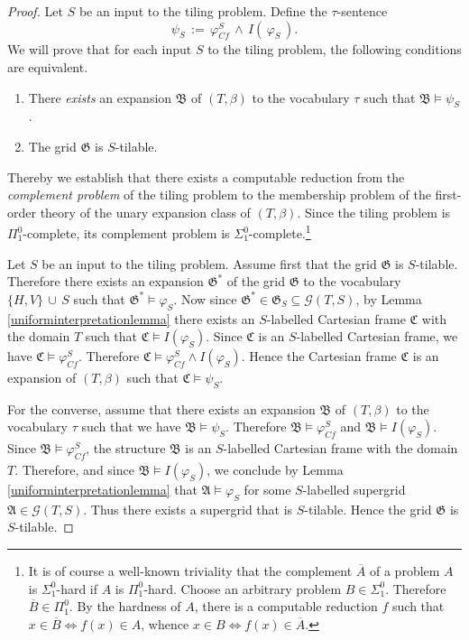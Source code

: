 \documentclass{LMCS}
\theoremstyle{plain}
\newcommand{\mf}{\mathfrak}
\newcommand{\mi}{\mathit}
\begin{document}
\begin{proof}
%
Let $S$ be an input to the tiling problem. Define the $\tau$-sentence 
%
%
%
\[
\psi_{S}\, :=\, 
%
 \varphi_{\mi{Cf}}^S\, \wedge\, I(\, \varphi_{S}\, ).
%
\]
%
%
%
We will prove that for each
%
input $S$ to the tiling problem, the following conditions are equivalent.
%
%
%
\begin{enumerate}
%
\item
There \emph{exists} an expansion $\mf{B}$ of $(T,\beta)$ to the vocabulary $\tau$
%
such that $\mf{B}\models\psi_S$.
%
\item
The grid $\mf{G}$ is $S$-tilable.
%
\end{enumerate}
%
%
%
Thereby we establish that there exists a computable reduction from the
%
\emph{complement problem} of the tiling problem
%
to the membership problem of the first-order theory of the unary expansion class of $(T,\beta)$.
%
Since the tiling problem is $\Pi_1^0$-complete,
%
its complement problem is $\Sigma_1^0$-complete.\footnote{It is of course a
%
well-known triviality that the complement $\overline{A}$ of a problem $A$ is $\Sigma^0_1$-hard
%
if $A$ is $\Pi^0_1$-hard. 
%
Choose an arbitrary problem $B\in \Sigma^0_1$. 
%
Therefore $\overline{B}\in\Pi^0_1$.
%
By the hardness of $A$, there is a computable 
%
reduction $f$ such that $x\in\overline{B}\Leftrightarrow f(x)\in A$, 
%
whence $x\in B\Leftrightarrow f(x)\in \overline{A}$.}
%



%
Let $S$ be an input to the tiling problem.
%
Assume first that the grid $\mf{G}$ is $S$-tilable.
%
Therefore there exists an expansion $\mf{G}^*$ of the grid $\mf{G}$ to the
%
vocabulary $\{H,V\}\, \cup\, S$
%
such that $\mf{G}^*\models\varphi_{S}$.
%
Now since $\mf{G}^*\in\mf{G}_S\subseteq\mathcal{G}(T,S)$, by Lemma \ref{uniforminterpretationlemma} there
%
exists an $S$-labelled Cartesian frame $\mf{C}$ with the domain $T$ such that
%
$\mf{C}\models I(\varphi_{S})$. 
%
Since $\mf{C}$ is an $S$-labelled Cartesian frame, we have $\mf{C}\models \varphi_{\mi{Cf}}^S$.
%
Therefore $\mf{C}\models \varphi_{\mi{Cf}}^S\wedge I(\varphi_{S})$.
%
Hence the Cartesian frame $\mf{C}$ is an expansion of $(T,\beta)$
%
such that $\mf{C}\models\psi_S$.
%



%
For the converse, assume that there exists an expansion $\mf{B}$ of $(T,\beta)$ to the
%
vocabulary $\tau$ 
%
such that we have $\mf{B}\models\psi_S$. Therefore 
%
$\mf{B}\models \varphi_{\mi{Cf}}^S$ and $\mf{B}\models I(\varphi_{S})$.
%
Since $\mf{B}\models \varphi_{\mi{Cf}}^S$, the structure 
%
$\mf{B}$ is an $S$-labelled Cartesian frame with the domain $T$. Therefore, and since $\mf{B}\models I(\varphi_{S})$,
%
we conclude by Lemma \ref{uniforminterpretationlemma}
%
that $\mf{A}\models\varphi_{S}$ for some $S$-labelled supergrid $\mf{A}\in\mathcal{G}(T,S)$.
%
Thus there exists a supergrid that is $S$-tilable.
%
Hence the grid $\mf{G}$ is $S$-tilable.
%
\end{proof}
\end{document}

